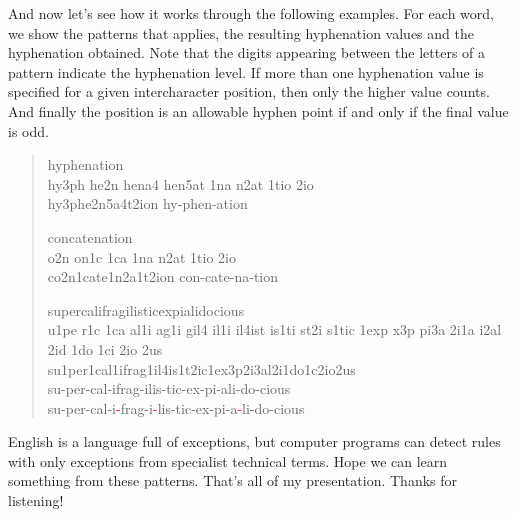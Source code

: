 \documentclass[11pt]{article}
\newenvironment{example}{%
  \begin{quotation}%
    \setlength{\parindent}{-\parindent}%
    \hyphenpenalty=10000%
    \ttfamily%
    \hspace{2.75\parindent}
  }{\end{quotation}}
\newcommand\bh{\textcolor{red}{-}}
\begin{document}
  And now let's see how it works through the following examples. For each word, we show the patterns that applies, the resulting hyphenation values and the hyphenation obtained. Note that the digits appearing between the letters of a pattern indicate the hyphenation level. If more than one hyphenation value is specified for a given intercharacter position, then only the higher value counts. And finally the position is an allowable hyphen point if and only if the final value is odd.

  \begin{example}
    hyphenation\\ hy3ph he2n hena4 hen5at 1na n2at 1tio 2io\\
    hy3phe2n5a4t2ion hy-phen-ation

    concatenation\\ o2n on1c 1ca 1na n2at 1tio 2io\\
    co2n1cate1n2a1t2ion con-cate-na-tion

    supercalifragilisticexpialidocious\\
      u1pe r1c 1ca al1i ag1i gil4 il1i il4ist is1ti st2i s1tic 1exp x3p pi3a 2i1a i2al 2id 1do 1ci 2io 2us\\
      su1per1cal1ifrag1il4is1t2ic1ex3p2i3al2i1do1c2io2us\\
      su-per-cal-ifrag-ilis-tic-ex-pi-ali-do-cious\\
      su-per-cal-i\bh frag-i\bh lis-tic-ex-pi-a\bh li-do-cious\\
  \end{example}

  English is a language full of exceptions, but computer programs can detect rules with only exceptions from specialist technical terms. Hope we can learn something from these patterns. That's all of my presentation. Thanks for listening!
\end{document}
